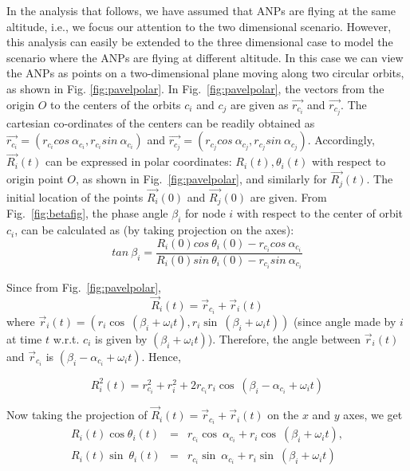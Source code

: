 \documentclass[10pt]{IEEEtran}
\begin{document}
\medskip
\noindent
In the analysis that follows, we have assumed that ANPs are flying at the same altitude, i.e., we focus our attention to the two dimensional scenario. However, this analysis can easily be extended to the three dimensional case to model the scenario where the  ANPs are flying at different altitude. In this case we can view the ANPs as points on a two-dimensional plane moving along two circular orbits, as shown in Fig. \ref{fig:pavelpolar}.  In Fig.~\ref{fig:pavelpolar}, the vectors from the origin $O$ to the centers of the orbits $c_{i}$ and $c_{j}$ are given as $\vec{r_{c_{i}}}$ and $\vec{r_{c_{j}}}$. The cartesian co-ordinates of the centers can be readily obtained as $\vec{r_{c_{i}}} = (r_{c_{i}}cos~\alpha_{c_{i}}, r_{c_{i}}sin~\alpha_{c_{i}})$ and $\vec{r_{c_{j}}} = (r_{c_{j}}cos~\alpha_{c_{j}}, r_{c_{j}}sin~\alpha_{c_{j}})$. Accordingly, $\vec{R_{i}}(t)$ can be expressed in polar coordinates: $R_{i}(t) ,\theta_{i}(t)$ with respect to origin point $O$, as shown in Fig.~\ref{fig:pavelpolar}, and similarly for $\vec{R_{j}}(t)$. The initial location of the points $\vec{R_{i}}(0)$ and $\vec{R_{j}}(0)$ are given. From Fig.~\ref{fig:betafig}, the phase angle $\beta_{i}$ for node $i$ with respect to the center of orbit $c_{i}$, can be calculated as (by taking projection on the axes):
\begin{equation}
tan~\beta_{i} = \frac{ R_{i}(0)cos~\theta_{i}(0) - r_{c_{i}}cos~\alpha_{c_{i}} }{ R_{i}(0)sin~\theta_{i}(0) - r_{c_{i}}sin~\alpha_{c_{i}}}
\label{eq:beta}
\end{equation}

\noindent
Since from Fig.~\ref{fig:pavelpolar},
\begin{equation}
\vec R_{i}(t)=\vec r_{c_i} + \vec r_{i}(t)
\label{eq:vR}
\end{equation}
where $\vec r_{i}(t) = (r_{i} \cos~(\beta_{i} + \omega_{i}t ), r_{i} \sin~(\beta_{i} + \omega_{i}t ))$ (since angle made by $i$ at time $t$ w.r.t. $c_{i}$ is given by $(\beta_{i} + \omega_{i}t)$). Therefore, the angle between $\vec r_{i}(t)$ and $\vec r_{c_{i}}$ is $(\beta_{i} - \alpha_{c_{i}} + \omega_{i}t )$. Hence, 

\begin{equation}
R_{i}^{2}(t)= r_{c_i}^2 + r_{i}^{2} + 2r_{c_i} r_{i} \cos~(\beta_{i} - \alpha_{c_{i}} + \omega_{i}t )
\label{eq:R}
\end{equation}

\noindent
Now taking the projection of  $\vec R_{i}(t)=\vec r_{c_i} + \vec r_{i}(t)$ on the $x$ and $y$ axes, we get
\begin{eqnarray}
R_{i}(t)\cos \theta_{i}(t) & = & r_{c_i}\cos~\alpha_{c_i} + r_{i}\cos~(\beta_{i} + \omega_{i}t),
\label{eq:Rx}
\\
R_{i}(t)\sin~\theta_{i}(t) & = & r_{c_i}\sin~\alpha_{c_{i}} + r_{i}\sin~(\beta_{i} + \omega_{i}t)~~~
\label{eq:Ry}
\end{eqnarray}
\end{document}
